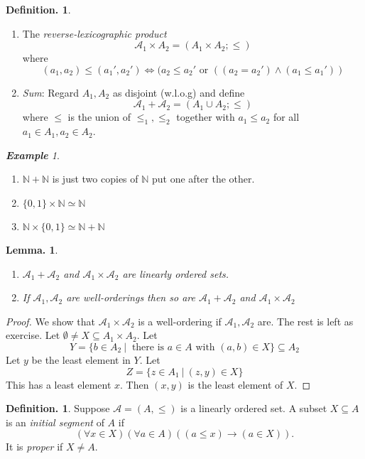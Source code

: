 \documentclass[a4paper,oneside,11pt,DIV=12,parskip=half]{scrartcl}
\newcommand{\N}{\mathbb N}
\newcommand{\A}{\mathcal A}
\theoremstyle{plain}
\newtheorem{lemma}[theorem]{Lemma.}
\theoremstyle{definition}
\newtheorem{definition}[theorem]{Definition.}
\newtheorem{remark, definition}[theorem]{Remark and Definition.}
\newtheorem{lemma, definition}[theorem]{Lemma and Definition.}
\newtheorem{theorem, definition}[theorem]{Theorem and Definition.}
\theoremstyle{remark}
\newtheorem*{example}{\textbf{Example}}
\newtheorem*{remark, example}{\textbf{Remark and Exercise}}
\begin{document}
\begin{definition}
\begin{enumerate}
    \item The \emph{reverse-lexicographic product}
        \[ \A_1 \times A_2 = (A_1 \times A_2; \leq) \]
    where
        \[ (a_1,a_2) \leq (a_1', a_2') \Leftrightarrow (a_2 \leq a_2' \text{ or } ((a_2 = a_2') \land (a_1 \leq a_1')) \]
    \item \emph{Sum}: Regard $A_1,A_2$ as disjoint (w.l.o.g) and define
        \[ \A_1 + \A_2 = (A_1 \cup A_2 ; \leq) \]
    where $\leq$ is the union of $\leq_1, \leq_2$ together with $a_1 \leq a_2$ for all $a_1 \in A_1, a_2 \in A_2$.
\end{enumerate}
\end{definition}

\begin{example}
\begin{enumerate}
    \item $\N + \N$ is just two copies of $\N$ put one after the other.
    \item $\{0,1\} \times \N \simeq \N$
    \item $\N \times \{0,1\} \simeq \N + \N$
\end{enumerate}
\end{example}

\begin{lemma}
\begin{enumerate}
    \item $\A_1 + \A_2$ and $\A_1 \times \A_2$ are linearly ordered sets.
    \item If $\A_1,\A_2$ are well-orderings then so are $\A_1 + \A_2$ and $\A_1 \times \A_2$
\end{enumerate}
\end{lemma}

\begin{proof}
We show that $\A_1 \times \A_2$ is a well-ordering if $\A_1, \A_2$ are. The rest is left as exercise.
Let $\emptyset \neq X \subseteq A_1 \times A_2$. Let 
    \[ Y = \{b \in A_2 ~|~ \text{ there is $a \in A$ with $(a,b) \in X$} \} \subseteq A_2 \] 
Let $y$ be the least element in $Y$. Let 
    \[ Z= \{ z \in A_1 ~|~ (z,y) \in X \} \]
This has a least element $x$. Then $(x,y)$ is the least element of $X$.
\end{proof}

\begin{definition}
Suppose $\A = (A,\leq)$ is a linearly ordered set. A subset $X \subseteq A$ is an \emph{initial segment} of $A$ if
    \[ (\forall x \in X)(\forall a \in A)((a \leq x) \rightarrow (a \in X)). \]
It is \emph{proper} if $X \neq A$.
\end{definition}
\end{document}
